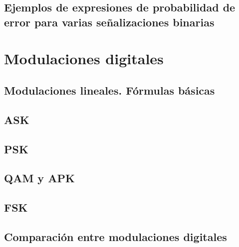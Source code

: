 \documentclass[a4paper]{book}
\begin{document}
\section[\texorpdfstring{Ejemplos de expresiones de probabilidad de error para varias\\ señalizaciones binarias}{Ejemplos de expresiones de probabilidad de error para varias señalizaciones binarias}]{Ejemplos de expresiones de probabilidad de error para varias señalizaciones binarias}

\chapter{Modulaciones digitales}
\section{Modulaciones lineales. Fórmulas básicas}
\section{ASK}
\section{PSK}
\section{QAM y APK}
\section{FSK}
\section{Comparación entre modulaciones digitales}


%
\end{document}
